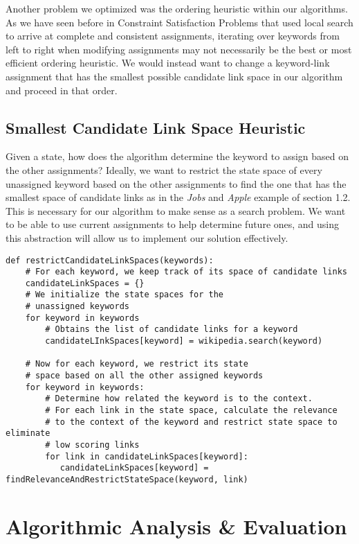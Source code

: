 \documentclass[twoside,11pt]{article}
\begin{document}
Another problem we optimized was the ordering heuristic within our algorithms. As we have seen before in Constraint Satisfaction Problems that used local search to arrive at complete and consistent assignments, iterating over keywords from left to right when modifying assignments may not necessarily be the best or most efficient ordering heuristic. We would instead want to change a keyword-link assignment that has the smallest possible candidate link space in our algorithm and proceed in that order.


\subsection{Smallest Candidate Link Space Heuristic}

Given a state, how does the algorithm determine the keyword to assign based on the other assignments? Ideally, we want to restrict the state space of every unassigned keyword based on the other assignments to find the one that has the smallest space of candidate links as in the \textit{Jobs} and \textit{Apple} example of section 1.2. This is necessary for our algorithm to make sense as a search problem. We want to be able to use current assignments to help determine future ones, and using this abstraction will allow us to implement our solution effectively.

\begin{lstlisting}
def restrictCandidateLinkSpaces(keywords):
    # For each keyword, we keep track of its space of candidate links
    candidateLinkSpaces = {}
    # We initialize the state spaces for the
    # unassigned keywords
    for keyword in keywords
        # Obtains the list of candidate links for a keyword
        candidateLInkSpaces[keyword] = wikipedia.search(keyword)

    # Now for each keyword, we restrict its state
    # space based on all the other assigned keywords
    for keyword in keywords:
        # Determine how related the keyword is to the context.
        # For each link in the state space, calculate the relevance
        # to the context of the keyword and restrict state space to eliminate
        # low scoring links
        for link in candidateLinkSpaces[keyword]:
           candidateLinkSpaces[keyword] =  findRelevanceAndRestrictStateSpace(keyword, link)

\end{lstlisting}



\section{Algorithmic Analysis \& Evaluation}
\end{document}
